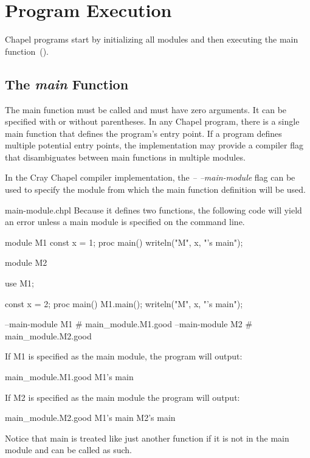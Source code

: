 \section{Program Execution}
\label{Program_Execution}

Chapel programs start by initializing all modules and then executing
the main function~().

\subsection{The {\em main} Function}
\label{The_main_Function}

The main function must be called  and must have zero
arguments.  It can be specified with or without parentheses.  In any
Chapel program, there is a single main function that defines the
program's entry point.  If a program defines multiple potential entry
points, the implementation may provide a compiler flag that
disambiguates between main functions in multiple modules.

\begin{craychapel}
In the Cray Chapel compiler implementation, the \emph{--
--main-module} flag can be used to specify the module from which the
main function definition will be used.
\end{craychapel}

\begin{chapelexample}{main-module.chpl}
Because it defines two  functions, the following code will yield an
error unless a main module is specified on the command line.
\begin{chapel}
module M1 {
  const x = 1;
  proc main() {
    writeln("M", x, "'s main");
  }
}
 
module M2 {
  use M1;

  const x = 2;
  proc main() {
    M1.main();
    writeln("M", x, "'s main");
  }
}
\end{chapel}
\begin{chapelcompopts}
--main-module M1 \# main\_module.M1.good
--main-module M2 \# main\_module.M2.good
\end{chapelcompopts}
If M1 is specified as the main module, the program will output:
\begin{chapelprintoutput}{main_module.M1.good}
M1's main
\end{chapelprintoutput}
If M2 is specified as the main module the program will output:
\begin{chapelprintoutput}{main_module.M2.good}
M1's main
M2's main
\end{chapelprintoutput}
Notice that main is treated like just another function if it is not in
the main module and can be called as such.
\end{chapelexample}


